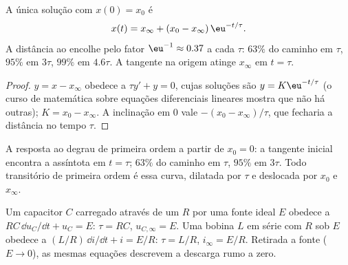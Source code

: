 \begin{theorem}[Solução]\label{thm:b1:transient-regimes:firstorder}
A única solução com $x(0) = x_0$ é
\[
x(t) = x_\infty + (x_0 - x_\infty)\,\eu^{-t/\tau} .
\]
A distância ao  encolhe pelo fator $\eu^{-1} \approx
0.37$ a cada $\tau$: $63\%$ do caminho em $\tau$, $95\%$ em $3\tau$,
$99\%$ em $4.6\tau$. A tangente na origem atinge $x_\infty$ em
$t = \tau$.
\end{theorem}

\begin{proof}
$y = x - x_\infty$ obedece a $\tau y' + y = 0$, cujas soluções são
$y = K\eu^{-t/\tau}$ (o curso de matemática sobre equações diferenciais
lineares mostra que não há outras); $K = x_0 - x_\infty$. A inclinação
em $0$ vale $-(x_0 - x_\infty)/\tau$, que fecharia a distância no tempo
$\tau$.
\end{proof}

\begin{omfigure}

{\small A resposta ao degrau de primeira ordem a partir de $x_0 = 0$: a tangente
inicial encontra a assíntota em $t = \tau$; $63\%$ do caminho em $\tau$,
$95\%$ em $3\tau$. Todo transitório de primeira ordem é essa curva, dilatada
por $\tau$ e deslocada por $x_0$ e $x_\infty$.}
\end{omfigure}

\begin{proposition}[Circuitos RC e RL]\label{prop:b1:transient-regimes:rcrl}
Um capacitor $C$ carregado através de um  $R$ por uma fonte ideal $E$
obedece a $RC\,\dd u_C/\dd t + u_C = E$: $\tau = RC$, $u_{C,\infty} = E$. Uma
bobina $L$ em série com $R$ sob $E$ obedece a $(L/R)\,\dd i/\dd t + i =
E/R$: $\tau = L/R$, $i_\infty = E/R$. Retirada a fonte
($E \to 0$), as mesmas equações descrevem a descarga rumo a zero.
\end{proposition}

